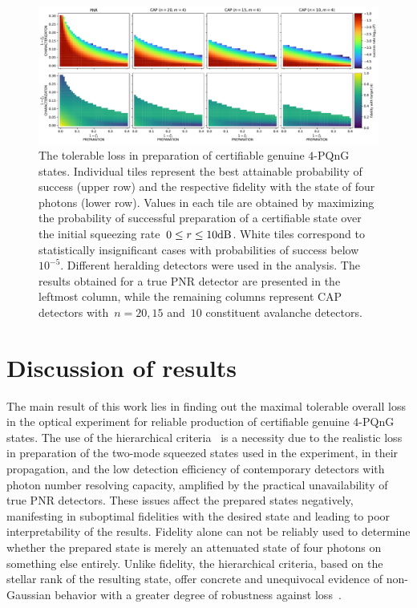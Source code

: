 \documentclass{article}
\begin{document}
%
%

\begin{figure}[h]
  \begin{center}
    \includegraphics[width = \columnwidth]{import/202411/paper_unified_04.pdf}
  \end{center}
  \caption{
    The tolerable loss in preparation of certifiable genuine $4$-PQnG states. Individual tiles represent the best attainable probability of success (upper row) and the respective fidelity with the state of four photons (lower row). Values in each tile are obtained by maximizing the probability of successful preparation of a certifiable state over the initial squeezing rate~${0 \leq r \leq 10\mathrm{dB}}$. White tiles correspond to statistically insignificant cases with probabilities of success below $10^{-5}$. Different heralding detectors were used in the analysis. The results obtained for a true PNR detector are presented in the leftmost column, while the remaining columns represent CAP detectors with~${n = 20, 15}$ and~$10$ constituent avalanche detectors.
  }
  \label{f-res-4}
\end{figure}

\section{Discussion of results}

The main result of this work lies in finding out the maximal tolerable overall loss in the optical experiment for reliable production of certifiable genuine $4$-PQnG states. The use of the hierarchical criteria~\cite{lachman2019} is a necessity due to the realistic loss in preparation of the two-mode squeezed states used in the experiment, in their propagation, and the low detection efficiency of contemporary detectors with photon number resolving capacity, amplified by the practical unavailability of true PNR detectors. These issues affect the prepared states negatively, manifesting in suboptimal fidelities with the desired state and leading to poor interpretability of the results. Fidelity alone can not be reliably used to determine whether the prepared state is merely an attenuated state of four photons on something else entirely. Unlike fidelity, the hierarchical criteria, based on the stellar rank of the resulting state, offer concrete and unequivocal evidence of non-Gaussian behavior with a greater degree of robustness against loss~\cite{lachman2019}.
\end{document}
